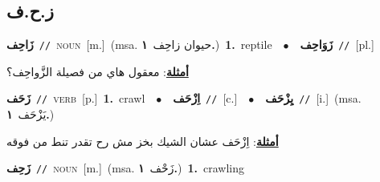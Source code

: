 \documentclass[10pt,a4paper,twoside]{article} %
\begin{document}
\begin{multicols}{2}
\vspace{-3mm}
\subsection*{\color{blue}\foreignlanguage{arabic}{ز.ح.ف}\color{blue}{}} 

{\setlength\topsep{0pt}\textbf{\foreignlanguage{arabic}{زَاحِف}}\ {\color{gray}\texttt{//}\color{black}}\ \textsc{noun}\ [m.]\ \color{gray}(msa. \foreignlanguage{arabic}{حيوان زاحِف}~\foreignlanguage{arabic}{\textbf{١.}})\color{black}\ \textbf{1.}~reptile\ \ $\bullet$\ \ \setlength\topsep{0pt}\textbf{\foreignlanguage{arabic}{زَوَاحِف}}\ {\color{gray}\texttt{//}\color{black}}\ [pl.]\  \begin{flushright}\color{gray}\foreignlanguage{arabic}{\textbf{\underline{\foreignlanguage{arabic}{أمثلة}}}: معقول هاي من فصيلة الزَّواحِف؟}\end{flushright}\color{black}} \vspace{2mm}

{\setlength\topsep{0pt}\textbf{\foreignlanguage{arabic}{زَحَف}}\ {\color{gray}\texttt{//}\color{black}}\ \textsc{verb}\ [p.]\ \textbf{1.}~crawl\ \ $\bullet$\ \ \setlength\topsep{0pt}\textbf{\foreignlanguage{arabic}{اِزْحَف}}\ {\color{gray}\texttt{//}\color{black}}\ [c.]\ \ $\bullet$\ \ \setlength\topsep{0pt}\textbf{\foreignlanguage{arabic}{يِزْحَف}}\ {\color{gray}\texttt{//}\color{black}}\ [i.]\ \color{gray}(msa. \foreignlanguage{arabic}{يَزْحَف}~\foreignlanguage{arabic}{\textbf{١.}})\color{black}\  \begin{flushright}\color{gray}\foreignlanguage{arabic}{\textbf{\underline{\foreignlanguage{arabic}{أمثلة}}}: اِزْحَف عشان الشيك بخز مش رح تقدر تنط من فوقه}\end{flushright}\color{black}} \vspace{2mm}

{\setlength\topsep{0pt}\textbf{\foreignlanguage{arabic}{زَحِف}}\ {\color{gray}\texttt{//}\color{black}}\ \textsc{noun}\ [m.]\ \color{gray}(msa. \foreignlanguage{arabic}{زَحْف}~\foreignlanguage{arabic}{\textbf{١.}})\color{black}\ \textbf{1.}~crawling\ } \vspace{2mm}


\end{multicols}
\end{document}
